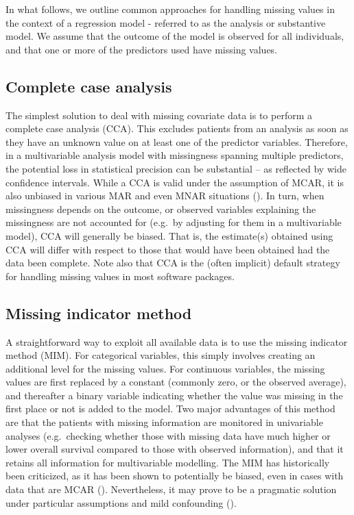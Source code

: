 \documentclass[
  letterpaper,
  paper=240mm:170mm,
  twoside=true,
  open=right,
  fontsize=10pt,
  pagesize=false,
  BCOR=15mm,
  DIV=14,
  headinclude=true,
  footinclude=false,
  headsepline=on]{scrbook}
\begin{document}
In what follows, we outline common approaches for handling missing
values in the context of a regression model - referred to as the
analysis or substantive model. We assume that the outcome of the model
is observed for all individuals, and that one or more of the predictors
used have missing values.

\subsection{Complete case analysis}\label{complete-case-analysis}

The simplest solution to deal with missing covariate data is to perform
a complete case analysis (CCA). This excludes patients from an analysis
as soon as they have an unknown value on at least one of the predictor
variables. Therefore, in a multivariable analysis model with missingness
spanning multiple predictors, the potential loss in statistical
precision can be substantial -- as reflected by wide confidence
intervals. While a CCA is valid under the assumption of MCAR, it is also
unbiased in various MAR and even MNAR situations
(). In turn, when missingness depends on the outcome, or observed
variables explaining the missingness are not accounted for (e.g.~by
adjusting for them in a multivariable model), CCA will generally be
biased. That is, the estimate(s) obtained using CCA will differ with
respect to those that would have been obtained had the data been
complete. Note also that CCA is the (often implicit) default strategy
for handling missing values in most software packages.

\subsection{Missing indicator method}\label{missing-indicator-method}

A straightforward way to exploit all available data is to use the
missing indicator method (MIM). For categorical variables, this simply
involves creating an additional level for the missing values. For
continuous variables, the missing values are first replaced by a
constant (commonly zero, or the observed average), and thereafter a
binary variable indicating whether the value was missing in the first
place or not is added to the model. Two major advantages of this method
are that the patients with missing information are monitored in
univariable analyses (e.g.~checking whether those with missing data have
much higher or lower overall survival compared to those with observed
information), and that it retains all information for multivariable
modelling. The MIM has historically been criticized, as it has been
shown to potentially be biased, even in cases with data that are MCAR
(). Nevertheless, it may prove to be a pragmatic solution
under particular assumptions and mild confounding
().
\end{document}
